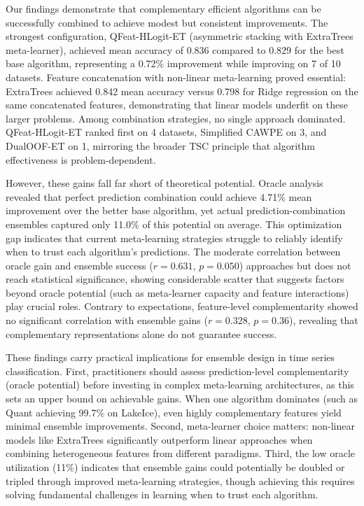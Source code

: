 \documentclass[pdflatex,sn-basic]{sn-jnl}           %
\theoremstyle{thmstyleone}%
\theoremstyle{thmstyletwo}%
\theoremstyle{thmstylethree}%
\begin{document}
Our findings demonstrate that complementary efficient algorithms can be successfully combined to achieve modest but consistent improvements. The strongest configuration, QFeat-HLogit-ET (asymmetric stacking with ExtraTrees meta-learner), achieved mean accuracy of 0.836 compared to 0.829 for the best base algorithm, representing a 0.72\% improvement while improving on 7 of 10 datasets. Feature concatenation with non-linear meta-learning proved essential: ExtraTrees achieved 0.842 mean accuracy versus 0.798 for Ridge regression on the same concatenated features, demonstrating that linear models underfit on these larger problems. Among combination strategies, no single approach dominated. QFeat-HLogit-ET ranked first on 4 datasets, Simplified CAWPE on 3, and DualOOF-ET on 1, mirroring the broader TSC principle that algorithm effectiveness is problem-dependent.

However, these gains fall far short of theoretical potential. Oracle analysis revealed that perfect prediction combination could achieve 4.71\% mean improvement over the better base algorithm, yet actual prediction-combination ensembles captured only 11.0\% of this potential on average. This optimization gap indicates that current meta-learning strategies struggle to reliably identify when to trust each algorithm's predictions. The moderate correlation between oracle gain and ensemble success ($r=0.631$, $p=0.050$) approaches but does not reach statistical significance, showing considerable scatter that suggests factors beyond oracle potential (such as meta-learner capacity and feature interactions) play crucial roles. Contrary to expectations, feature-level complementarity showed no significant correlation with ensemble gains ($r=0.328$, $p=0.36$), revealing that complementary representations alone do not guarantee success.

These findings carry practical implications for ensemble design in time series classification. First, practitioners should assess prediction-level complementarity (oracle potential) before investing in complex meta-learning architectures, as this sets an upper bound on achievable gains. When one algorithm dominates (such as Quant achieving 99.7\% on LakeIce), even highly complementary features yield minimal ensemble improvements. Second, meta-learner choice matters: non-linear models like ExtraTrees significantly outperform linear approaches when combining heterogeneous features from different paradigms. Third, the low oracle utilization (11\%) indicates that ensemble gains could potentially be doubled or tripled through improved meta-learning strategies, though achieving this requires solving fundamental challenges in learning when to trust each algorithm.
\end{document}
